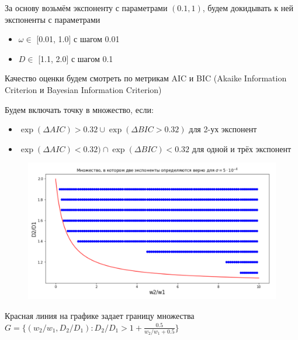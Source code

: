 \documentclass{beamer}      %
\begin{document}
    \begin{frame}
        За основу возьмём экспоненту с параметрами
        $(0.1, 1)$, будем докидывать к ней экспоненты с параметрами

        \begin{itemize}
            \item $\omega \in $ [0.01, 1.0] с шагом 0.01
            \item $D \in $  [1.1, 2.0] с шагом 0.1
        \end{itemize}

        Качество оценки будем смотреть по метрикам AIC и BIC
        (Akaike Information Criterion и Bayesian Information Criterion)



        \hspace{1pt}

        Будем включать точку в множество, если:
        \begin{itemize}
            \item $\exp(\Delta AIC) > 0.32  \cup  \exp(\Delta BIC > 0.32)$ для 2-ух экспонент
            \item $\exp(\Delta AIC) < 0.32) \cap \exp(\Delta BIC) < 0.32$ для одной и трёх экспонент
        \end{itemize}
    \end{frame}

    \begin{frame}
        \begin{figure}[ht]
            \includegraphics[width=1.0\textwidth]{Множество}
        \end{figure}

        Красная линия на графике задает границу множества
        $G = \{(w_2/w_1, D_2/D_1) : D_2/D_1 > 1 + \frac{0.5}{w_2/w_1 + 0.5} \}$

    \end{frame}
\end{document}
